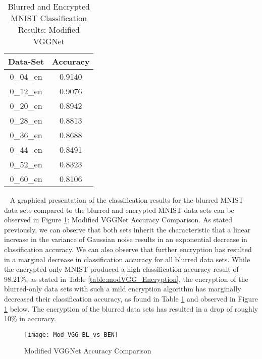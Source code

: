 \documentclass[12pt, titlepage]{article}
\begin{document}
\begin{table}[!h]
	\begin{center}
		\begin{tabular}{| c | c |}
			\hline
			\textbf{Data-Set} & \textbf{Accuracy}\\
			\hline
			0\_04\_en & 0.9140\\
			\hline
			0\_12\_en & 0.9076\\
			\hline
			0\_20\_en & 0.8942\\
			\hline
			0\_28\_en & 0.8813\\
			\hline
			0\_36\_en & 0.8688\\
			\hline
			0\_44\_en & 0.8491\\
			\hline
			0\_52\_en & 0.8323\\
			\hline
			0\_60\_en & 0.8106\\
			\hline
		\end{tabular}
		\caption{Blurred and Encrypted MNIST Classification Results: Modified VGGNet}
		\label{table:modVGG_BlurredEncrypted}
	\end{center}
\end{table} 

~\newpage
\noindent A graphical presentation of the classification results for the blurred MNIST data sets compared to the blurred and encrypted MNIST data sets can be observed in Figure \ref{GRAPH_ModifiedVGG}: Modified VGGNet Accuracy Comparison. As stated previously, we can observe that both sets inherit the characteristic that a linear increase in the variance of Gaussian noise results in an exponential decrease in classification accuracy. We can also observe that further encryption has resulted in a marginal decrease in classification accuracy for all blurred data sets. While the encrypted-only MNIST produced a high classification accuracy result of 98.21\%, as stated in Table \ref{table:modVGG_Encryption}, the encryption of the blurred-only data sets with such a mild encryption algorithm has marginally decreased their classification accuracy, as found in Table \ref{table:modVGG_BlurredEncrypted} and observed in Figure \ref{GRAPH_ModifiedVGG} below. The encryption of the blurred data sets has resulted in a drop of roughly 10\% in accuracy.

\begin{figure}[h!]
	\begin{center}
		\texttt{[image: Mod\_VGG\_BL\_vs\_BEN]}
		\caption{Modified VGGNet Accuracy Comparison}
		\label{GRAPH_ModifiedVGG}
	\end{center}
\end{figure} 
\end{document}

